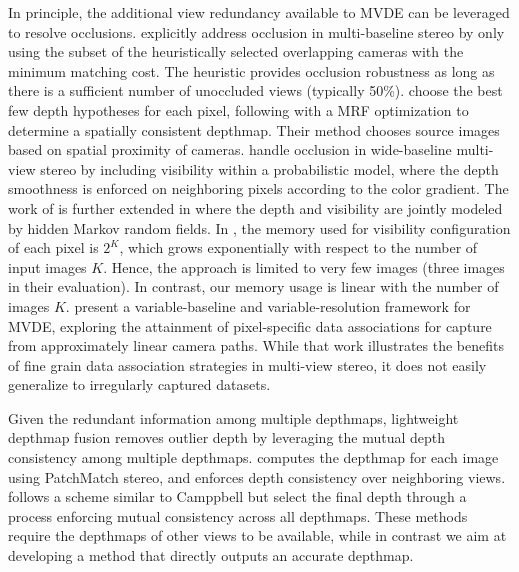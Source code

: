 In principle, the additional view  redundancy available to MVDE can be leveraged to resolve occlusions. \citet{handle_occlusion2001} explicitly address occlusion in multi-baseline stereo by only using the subset of the heuristically selected overlapping cameras with the minimum matching cost. The heuristic provides occlusion robustness as long as there is a sufficient number of unoccluded views (typically 50\%). \citet{MultiHypothesis_ECCV2008} choose the best few depth hypotheses for each pixel, following with a MRF optimization to determine a spatially consistent depthmap. Their method chooses source images based on spatial proximity of cameras. \citet{Strecha_BayesModelCVPR2004} handle occlusion in wide-baseline multi-view stereo by including visibility within a probabilistic model, where the depth smoothness is enforced on neighboring pixels according to the color gradient. The work of \citet{Strecha_BayesModelCVPR2004} is further extended in \citet{CombinedDepthOutlier} where the depth and visibility are jointly modeled by hidden Markov random fields. In \citet{CombinedDepthOutlier}, the memory used for visibility configuration of each pixel is $2^K$, which grows exponentially with respect to the number of input images $K$. Hence, the approach is limited to very few images (three images in their evaluation). In contrast, our memory usage is linear with the number of images $K$. %
\citet{Gallup08} present a variable-baseline and variable-resolution framework for MVDE, exploring the attainment of pixel-specific data associations for capture from approximately linear camera paths. While that work illustrates the benefits of fine grain data association strategies in multi-view stereo, it does not easily generalize to irregularly captured datasets. %

Given the redundant information among multiple depthmaps,
lightweight depthmap fusion removes outlier depth by leveraging the mutual depth consistency among multiple depthmaps. 
\citet{Shen_TIP2013} computes the depthmap for each image using PatchMatch \mbox{stereo}, and enforces depth consistency over neighboring views. \citet{LeastCommitment_3DIMPVT2012} follows a scheme similar to Camppbell \citet{MultiHypothesis_ECCV2008} but select the final depth through a process enforcing mutual consistency across all depthmaps. These methods require the depthmaps of other views to be available, while in contrast we aim at developing a method that directly outputs an accurate depthmap. 

